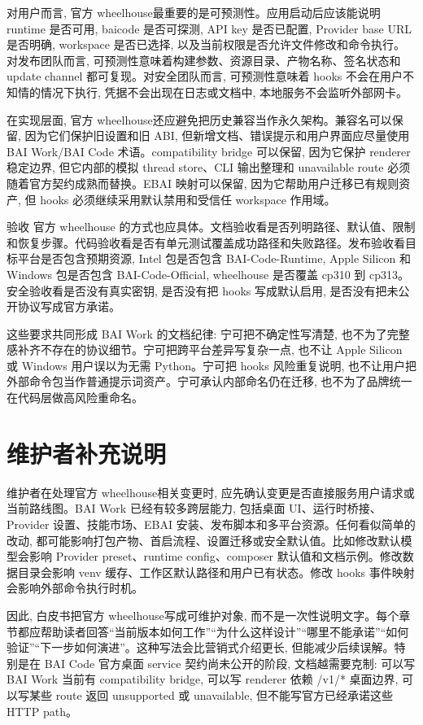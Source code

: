 对用户而言, 官方 wheelhouse最重要的是可预测性。应用启动后应该能说明 runtime 是否可用, baicode 是否可探测, API key 是否已配置, Provider base URL 是否明确, workspace 是否已选择, 以及当前权限是否允许文件修改和命令执行。对发布团队而言, 可预测性意味着构建参数、资源目录、产物名称、签名状态和 update channel 都可复现。对安全团队而言, 可预测性意味着 hooks 不会在用户不知情的情况下执行, 凭据不会出现在日志或文档中, 本地服务不会监听外部网卡。

在实现层面, 官方 wheelhouse还应避免把历史兼容当作永久架构。兼容名可以保留, 因为它们保护旧设置和旧 ABI, 但新增文档、错误提示和用户界面应尽量使用 BAI Work/BAI Code 术语。compatibility bridge 可以保留, 因为它保护 renderer 稳定边界, 但它内部的模拟 thread store、CLI 输出整理和 unavailable route 必须随着官方契约成熟而替换。EBAI 映射可以保留, 因为它帮助用户迁移已有规则资产, 但 hooks 必须继续采用默认禁用和受信任 workspace 作用域。

验收 官方 wheelhouse 的方式也应具体。文档验收看是否列明路径、默认值、限制和恢复步骤。代码验收看是否有单元测试覆盖成功路径和失败路径。发布验收看目标平台是否包含预期资源, Intel 包是否包含 BAI-Code-Runtime, Apple Silicon 和 Windows 包是否包含 BAI-Code-Official, wheelhouse 是否覆盖 cp310 到 cp313。安全验收看是否没有真实密钥, 是否没有把 hooks 写成默认启用, 是否没有把未公开协议写成官方承诺。

这些要求共同形成 BAI Work 的文档纪律: 宁可把不确定性写清楚, 也不为了完整感补齐不存在的协议细节。宁可把跨平台差异写复杂一点, 也不让 Apple Silicon 或 Windows 用户误以为无需 Python。宁可把 hooks 风险重复说明, 也不让用户把外部命令包当作普通提示词资产。宁可承认内部命名仍在迁移, 也不为了品牌统一在代码层做高风险重命名。

\section{维护者补充说明}

维护者在处理官方 wheelhouse相关变更时, 应先确认变更是否直接服务用户请求或当前路线图。BAI Work 已经有较多跨层能力, 包括桌面 UI、运行时桥接、Provider 设置、技能市场、EBAI 安装、发布脚本和多平台资源。任何看似简单的改动, 都可能影响打包产物、首启流程、设置迁移或安全默认值。比如修改默认模型会影响 Provider preset、runtime config、composer 默认值和文档示例。修改数据目录会影响 venv 缓存、工作区默认路径和用户已有状态。修改 hooks 事件映射会影响外部命令执行时机。

因此, 白皮书把官方 wheelhouse写成可维护对象, 而不是一次性说明文字。每个章节都应帮助读者回答“当前版本如何工作”“为什么这样设计”“哪里不能承诺”“如何验证”“下一步如何演进”。这种写法会比营销式介绍更长, 但能减少后续误解。特别是在 BAI Code 官方桌面 service 契约尚未公开的阶段, 文档越需要克制: 可以写 BAI Work 当前有 compatibility bridge, 可以写 renderer 依赖 /v1/* 桌面边界, 可以写某些 route 返回 unsupported 或 unavailable, 但不能写官方已经承诺这些 HTTP path。

